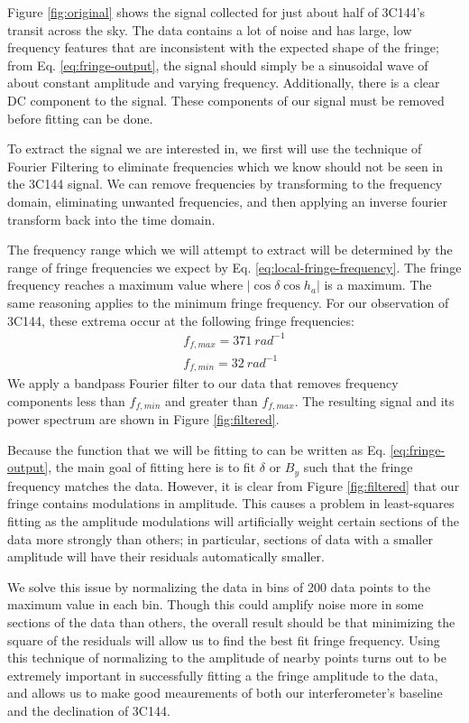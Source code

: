 \documentclass[12pt]{article}
\begin{document}
Figure \ref{fig:original} shows the signal collected for just about half of 3C144's transit across the sky. The data contains a lot of noise and has large, low frequency features that are inconsistent with the expected shape of the fringe; from Eq. \ref{eq:fringe-output}, the signal should simply be a sinusoidal wave of about constant amplitude and varying frequency. Additionally, there is a clear DC component to the signal. These components of our signal must be removed before fitting can be done.

To extract the signal we are interested in, we first will use the technique of Fourier Filtering to eliminate frequencies which we know should not be seen in the 3C144 signal. We can remove frequencies by transforming to the frequency domain, eliminating unwanted frequencies, and then applying an inverse fourier transform back into the time domain.

The frequency range which we will attempt to extract will be determined by the range of fringe frequencies we expect by Eq. \ref{eq:local-fringe-frequency}. The fringe frequency reaches a maximum value where $|\cos{\delta} \cos{h_a}|$ is a maximum. The same reasoning applies to the minimum fringe frequency. For our observation of 3C144, these extrema occur at the following fringe frequencies:
\begin{eqnarray}
f_{f, max} = 371\ rad^{-1}\\
f_{f, min} = 32\ rad^{-1}
\end{eqnarray}
We apply a bandpass Fourier filter to our data that removes frequency components less than $f_{f, min}$ and greater than $f_{f, max}$. The resulting signal and its power spectrum are shown in Figure \ref{fig:filtered}.

Because the function that we will be fitting to can be written as Eq. \ref{eq:fringe-output}, the main goal of fitting here is to fit $\delta$ or $B_y$ such that the fringe frequency matches the data. However, it is clear from Figure \ref{fig:filtered} that our fringe contains modulations in amplitude. This causes a problem in least-squares fitting as the amplitude modulations will artificially weight certain sections of the data more strongly than others; in particular, sections of data with a smaller amplitude will have their residuals automatically smaller. 

We solve this issue by normalizing the data in bins of 200 data points to the maximum value in each bin. Though this could amplify noise more in some sections of the data than others, the overall result should be that minimizing the square of the residuals will allow us to find the best fit fringe frequency. Using this technique of normalizing to the amplitude of nearby points turns out to be extremely important in successfully fitting a the fringe amplitude to the data, and allows us to make good meaurements of both our interferometer's baseline and the declination of 3C144.
\end{document}
